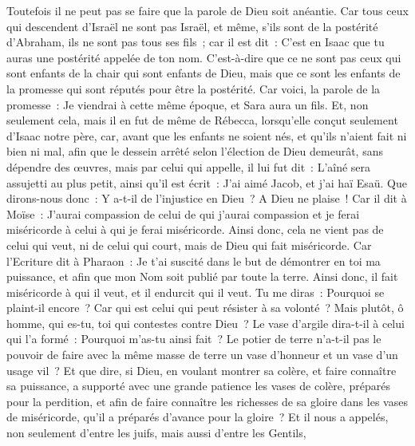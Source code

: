 \begin{multicols}{2}
Toutefois il ne peut pas se faire que la parole de Dieu soit anéantie. Car tous ceux qui descendent d'Israël ne sont pas Israël,
et même, s'ils sont de la postérité d'Abraham, ils ne sont pas tous ses fils~; car il est dit~: C'est en Isaac que tu auras une postérité appelée de ton nom.
C'est-à-dire que ce ne sont pas ceux qui sont enfants de la chair qui sont enfants de Dieu, mais que ce sont les enfants de la promesse qui sont réputés pour être la postérité.
Car voici, la parole de la promesse~: Je viendrai à cette même époque, et Sara aura un fils.
Et, non seulement cela, mais il en fut de même de Rébecca, lorsqu'elle conçut seulement d'Isaac notre père,
car, avant que les enfants ne soient nés, et qu'ils n'aient fait ni bien ni mal, afin que le dessein arrêté selon l'élection de Dieu demeurât, sans dépendre des œuvres, mais par celui qui appelle, 
il lui fut dit~: L'aîné sera assujetti au plus petit, ainsi qu'il est écrit~:
J'ai aimé Jacob, et j'ai haï Esaü.
Que dirons-nous donc~: Y a-t-il de l'injustice en Dieu~? A Dieu ne plaise~!
Car il dit à Moïse~: J'aurai compassion de celui de qui j'aurai compassion et je ferai miséricorde à celui à qui je ferai miséricorde.
Ainsi donc, cela ne vient pas de celui qui veut, ni de celui qui court, mais de Dieu qui fait miséricorde.
Car l'Ecriture dit à Pharaon~: Je t'ai suscité dans le but de démontrer en toi ma puissance, et afin que mon Nom soit publié par toute la terre.
Ainsi donc, il fait miséricorde à qui il veut, et il endurcit qui il veut.
Tu me diras~: Pourquoi se plaint-il encore~? Car qui est celui qui peut résister à sa volonté~?
Mais plutôt, ô homme, qui es-tu, toi qui contestes contre Dieu~? Le vase d'argile dira-t-il à celui qui l'a formé~: Pourquoi m'as-tu ainsi fait~?
Le potier de terre n'a-t-il pas le pouvoir de faire avec la même masse de terre un vase d'honneur et un vase d'un usage vil~?
Et que dire, si Dieu, en voulant montrer sa colère, et faire connaître sa puissance, a supporté avec une grande patience les vases de colère, préparés pour la perdition,
et afin de faire connaître les richesses de sa gloire dans les vases de miséricorde, qu'il a préparés d'avance pour la gloire~?
Et il nous a appelés, non seulement d'entre les juifs, mais aussi d'entre les Gentils,

\end{multicols}
